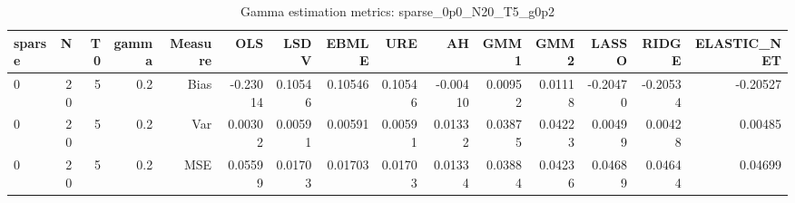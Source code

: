\begin{table}[!htbp]\centering
\caption{Gamma estimation metrics: sparse_0p0_N20_T5_g0p2}
\label{tab:table1_sparse_0p0_N20_T5_g0p2}
\begin{tabular}{lrrrrrrrrrrrrrr}
\hline
sparse & N & T0 & gamma & Measure & OLS & LSDV & EBMLE & URE & AH & GMM1 & GMM2 & LASSO & RIDGE & ELASTIC_NET \\
\hline
0 & 20 & 5 & 0.2 & Bias & -0.23014 & 0.10546 & 0.10546 & 0.10546 & -0.00410 & 0.00952 & 0.01118 & -0.20470 & -0.20534 & -0.20527 \\
0 & 20 & 5 & 0.2 & Var & 0.00302 & 0.00591 & 0.00591 & 0.00591 & 0.01332 & 0.03875 & 0.04223 & 0.00499 & 0.00428 & 0.00485 \\
0 & 20 & 5 & 0.2 & MSE & 0.05599 & 0.01703 & 0.01703 & 0.01703 & 0.01334 & 0.03884 & 0.04236 & 0.04689 & 0.04644 & 0.04699 \\
\hline
\end{tabular}
\end{table}

